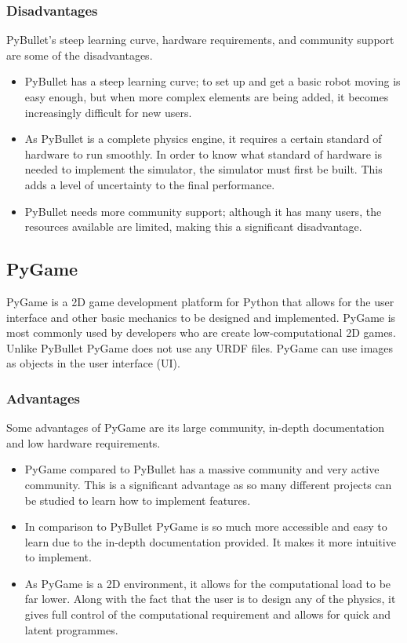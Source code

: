 \documentclass[a4paper,12pt]{article}
\begin{document}
\subsubsection{Disadvantages}

PyBullet's steep learning curve, hardware requirements, and community support are some of the disadvantages. 
\begin{itemize}
  \item PyBullet has a steep learning curve; to set up and get a basic robot moving is easy enough, but when more complex elements are being added, it becomes increasingly difficult for new users.
  \item As PyBullet is a complete physics engine, it requires a certain standard of hardware to run smoothly. In order to know what standard of hardware is needed to implement the simulator, the simulator must first be built. This adds a level of uncertainty to the final performance.
  \item PyBullet needs more community support; although it has many users, the resources available are limited, making this a significant disadvantage. 

\end{itemize}
 
\subsection{PyGame}

PyGame is a 2D game development platform for Python that allows for the user interface and other basic mechanics to be designed and implemented. PyGame is most commonly used by developers who are create low-computational 2D games. Unlike PyBullet PyGame does not use any URDF files. PyGame can use images as objects in the user interface (UI). 

\subsubsection{Advantages}
Some advantages of PyGame are its large community, in-depth documentation and low hardware requirements. 

\begin{itemize}
  \item PyGame compared to PyBullet has a massive community and very active community. This is a significant advantage as so many different projects can be studied to learn how to implement features. 
  \item In comparison to PyBullet PyGame is so much more accessible and easy to learn due to the in-depth documentation provided. It makes it more intuitive to implement. 

  \item As PyGame is a 2D environment, it allows for the computational load to be far lower. Along with the fact that the user is to design any of the physics, it gives full control of the computational requirement and allows for quick and latent programmes.


\end{itemize}
\end{document}
